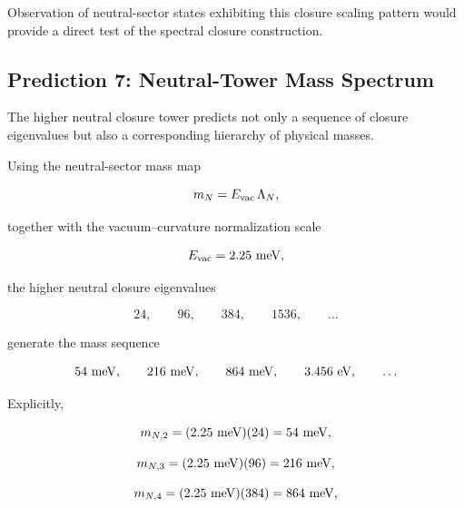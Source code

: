 \documentclass[11pt]{article}
\theoremstyle{definition}
\theoremstyle{remark}
\begin{document}
Observation of neutral-sector states exhibiting this closure
scaling pattern would provide a direct test of the spectral
closure construction.



\subsection{Prediction 7: Neutral-Tower Mass Spectrum}
\label{subsec:prediction_neutral_tower_masses}

The higher neutral closure tower predicts not only a sequence of
closure eigenvalues but also a corresponding hierarchy of
physical masses.

Using the neutral-sector mass map

\begin{equation}
m_N
=
E_{\rm vac}\,
\Lambda_N,
\label{eq:neutral_tower_mass_map}
\end{equation}

together with the vacuum--curvature normalization scale

\begin{equation}
E_{\rm vac}
=
2.25~{\rm meV},
\end{equation}

the higher neutral closure eigenvalues

\begin{equation}
24,
\qquad
96,
\qquad
384,
\qquad
1536,
\qquad
\ldots
\end{equation}

generate the mass sequence

\begin{equation}
54~{\rm meV},
\qquad
216~{\rm meV},
\qquad
864~{\rm meV},
\qquad
3.456~{\rm eV},
\qquad
\ldots
\end{equation}

Explicitly,

\begin{equation}
m_{N,2}
=
(2.25~{\rm meV})(24)
=
54~{\rm meV},
\end{equation}

\begin{equation}
m_{N,3}
=
(2.25~{\rm meV})(96)
=
216~{\rm meV},
\end{equation}

\begin{equation}
m_{N,4}
=
(2.25~{\rm meV})(384)
=
864~{\rm meV},
\end{equation}
\end{document}
